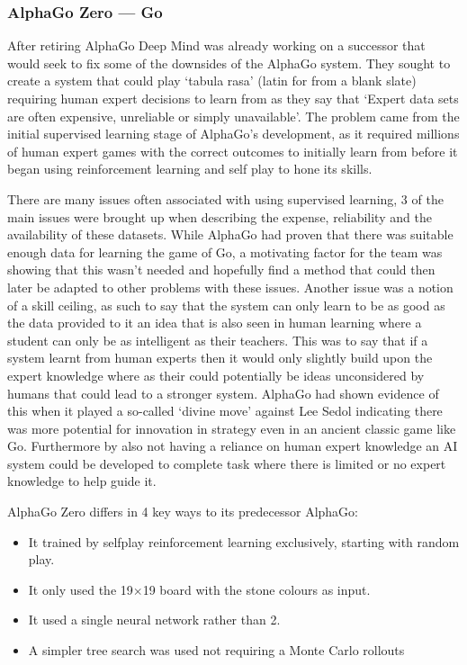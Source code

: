 \documentclass[a4paper]{article}
\begin{document}
\subsubsection{AlphaGo Zero --- Go}
After retiring AlphaGo Deep Mind was already working on a successor that would seek to fix some of the downsides of the AlphaGo system.
They sought to create a system that could play `tabula rasa' (latin for from a blank slate) requiring human expert decisions to learn from as they say that `Expert data sets are often expensive, unreliable or simply unavailable'\cite{alphaGoZero}.
The problem came from the initial supervised learning stage of AlphaGo's development, as it required millions of human expert games with the correct outcomes to initially learn from before it began using reinforcement learning and self play to hone its skills.
\par
There are many issues often associated with using supervised learning, 3 of the main issues were brought up when describing the expense, reliability and the availability of these datasets.
While AlphaGo had proven that there was suitable enough data for learning the game of Go, a motivating factor for the team was showing that this wasn't needed and hopefully find a method that could then later be adapted to other problems with these issues.
Another issue was a notion of a skill ceiling, as such to say that the system can only learn to be as good as the data provided to it an idea that is also seen in human learning where a student can only be as intelligent as their teachers.
This was to say that if a system learnt from human experts then it would only slightly build upon the expert knowledge where as their could potentially be ideas unconsidered by humans that could lead to a stronger system.
AlphaGo had shown evidence of this when it played a so-called `divine move' against Lee Sedol indicating there was more potential for innovation in strategy even in an ancient classic game like Go.
Furthermore by also not having a reliance on human expert knowledge an AI system could be developed to complete task where there is limited or no expert knowledge to help guide it.
\par
AlphaGo Zero differs in 4 key ways to its predecessor AlphaGo:
\begin{itemize}[noitemsep,nolistsep]
    \item It trained by selfplay reinforcement learning exclusively, starting with random play.
    \item It only used the 19\( \times \)19 board with the stone colours as input.
    \item It used a single neural network rather than 2.
    \item A simpler tree search was used not requiring a Monte Carlo rollouts
\end{itemize}
\end{document}
